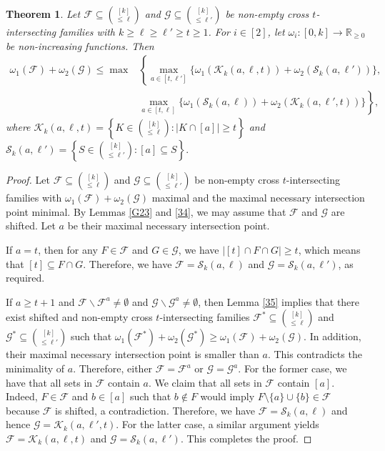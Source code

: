 \documentclass[11pt]{article}
\newtheorem{theorem}{Theorem}[section]
\begin{document}
\begin{theorem}\label{n1}
Let $\mathcal{F}\subseteq\binom{[k]}{\leq \ell}$ and $\mathcal{G} \subseteq\binom{[k]}{\leq \ell'}$ be non-empty cross $t$-intersecting families with $k \geq \ell \geq \ell' \geq t\geq 1$.  For $i \in[2]$, let $\omega_i:[0,k] \rightarrow \mathbb{R}_{\geq 0}$ be non-increasing functions.   Then
\begin{align*}
\omega_1(\mathcal{F})+\omega_2(\mathcal{G}) \leq \max &\left\{\max _{a\in[t, \ell']}\{ \omega_1(\mathcal{K}_k(a, \ell, t))+\omega_2(\mathcal{S}_k(a, \ell'))\},\right.\\
&\left. \max _{a\in [t,\ell]}\{ \omega_1( \mathcal{S}_k(a,\ell))+\omega_2(\mathcal{K}_k(a, \ell', t))\}\right\},
\end{align*}
where $ \mathcal{K}_k(a, \ell, t) =\left\{K \in\binom{[k]}{\leq \ell}:|K \cap[a]| \geq t\right\}$ and $ \mathcal{S}_k(a,\ell')  =\left\{S \in\binom{[k]}{\leq \ell'}:[a] \subseteq S\right\}.$
\end{theorem}
\begin{proof}
 Let $\mathcal{F}\subseteq\binom{[k]}{\leq \ell}$ and $\mathcal{G} \subseteq\binom{[k]}{\leq \ell'}$ be  non-empty cross $t$-intersecting families with $\omega_1(\mathcal{F})+\omega_2(\mathcal{G})$  maximal and the maximal necessary intersection point minimal. 
  By Lemmas \ref{G23} and \ref{34}, we may assume that $\mathcal{F}$ and $\mathcal{G}$ are shifted. Let $a$ be  their  maximal necessary intersection point.

 If $a=t$,  then  for any $F\in\mathcal{F}$ and $G\in\mathcal{G}$, we have
  $|[t]\cap F\cap G|\ge t$, which means that $[t]\subseteq  F\cap G$. 
 Therefore, we have $\mathcal{F}=\mathcal{S}_k(a,\ell)$ and  $\mathcal{G}=\mathcal{S}_k(a,\ell')$, as required.
 

If $a\ge t+1$ and  $\mathcal{F} \backslash \mathcal{F}^a \neq \emptyset$ and $\mathcal{G} \backslash \mathcal{G}^a \neq \emptyset$, then Lemma \ref{35} implies that there exist  shifted and non-empty cross $t$-intersecting families
  $\mathcal{F}^*\subseteq\binom{[k]}{\leq \ell}$ and $\mathcal{G}^* \subseteq\binom{[k]}{\leq \ell'}$ such that  $\omega_1(\mathcal{F}^*)+\omega_2(\mathcal{G}^*)\ge \omega_1(\mathcal{F})+\omega_2(\mathcal{G})$. In addition, their maximal necessary intersection point  is smaller than $a$. This contradicts the minimality of $a$.
Therefore, either  $\mathcal{F}= \mathcal{F}^a $ or $\mathcal{G} = \mathcal{G}^a $. For the former case,  we have that all sets in $\mathcal{F}$ contain $a$. We claim that all sets in $\mathcal{F}$ contain $[a]$. Indeed, $F\in\mathcal{F}$ and $b\in[a]$ such that $b\notin F$ would imply $F\setminus \{a\}\cup\{b\}\in \mathcal{F}$ because $\mathcal{F}$ is shifted, a contradiction.
Therefore, we have $\mathcal{F}=\mathcal{S}_k(a,\ell)$ and hence $\mathcal{G}=\mathcal{K}_k(a, \ell', t)$.
For the latter case,  a similar argument yields  
$\mathcal{F}=\mathcal{K}_k(a, \ell, t)$ and $\mathcal{G}=\mathcal{S}_k(a,\ell')$. This completes the proof.
\end{proof}
\end{document}
